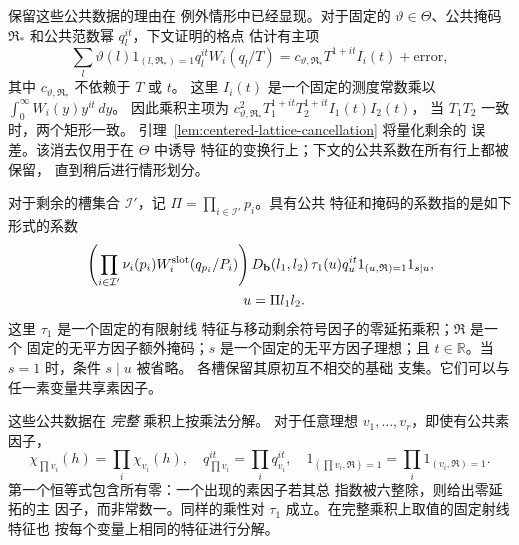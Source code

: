 \documentclass[11pt,a4paper]{article}
\numberwithin{equation}{section}
\numberwithin{figure}{section}
\theoremstyle{definition}
\theoremstyle{remark}
\begin{document}
保留这些公共数据的理由在
例外情形中已经显现。对于固定的 \(\vartheta\in\Theta\)、公共掩码
\(\mathfrak R_*\) 和公共范数幂 \(q_l^{it}\)，下文证明的格点
估计有主项
\[
 \sum_l\vartheta(l)1_{(l,\mathfrak R_*)=1}q_l^{it}W_i(q_l/T)
 =c_{\vartheta,\mathfrak R_*}T^{1+it}I_i(t)+\text{error},
\]
其中 \(c_{\vartheta,\mathfrak R_*}\) 不依赖于 \(T\) 或 \(t\)。
这里 \(I_i(t)\) 是一个固定的测度常数乘以
\(\int_0^\infty W_i(y)y^{it}\,dy\)。
因此乘积主项为
\(c_{\vartheta,\mathfrak R_*}^2T_1^{1+it}T_2^{1+it}I_1(t)I_2(t)\)，
当 \(T_1T_2\) 一致时，两个矩形一致。
引理~\ref{lem:centered-lattice-cancellation} 将量化剩余的
误差。该消去仅用于在 \(\Theta\) 中诱导
特征的变换行上；下文的公共系数在所有行上都被保留，
直到稍后进行情形划分。

对于剩余的槽集合 \(\mathcal I'\)，记
\(\Pi=\prod_{i\in\mathcal I'}p_i\)。具有公共
特征和掩码的系数指的是如下形式的系数
\begin{equation}
 \begin{split}
 &\left(\prod_{i\in\mathcal I'}
       \nu_i(p_i)W_i^{\rm slot}(q_{p_i}/P_i)\right)
 D_{\mathbf b}(l_1,l_2)\,
 \tau_1(u)q_u^{it}
 1_{(u,\mathfrak R)=1}1_{s\mid u},\\
 &\hspace{40mm}u=\Pi l_1l_2.
 \end{split}
 \label{eq:centered-coefficient-form}
\end{equation}
这里 \(\tau_1\) 是一个固定的有限射线
特征与移动剩余符号因子的零延拓乘积；\(\mathfrak R\) 是一个
固定的无平方因子额外掩码；\(s\) 是一个固定的无平方因子理想；且
\(t\in\mathbb R\)。当 \(s=1\) 时，条件 \(s\mid u\) 被省略。
各槽保留其原初互不相交的基础
支集。它们可以与任一素变量共享素因子。

这些公共数据在 \emph{完整} 乘积上按乘法分解。
对于任意理想 \(v_1,\ldots,v_r\)，即使有公共素因子，
\[
 \chi_{\prod v_i}(h)=\prod_i\chi_{v_i}(h),\quad
 q_{\prod v_i}^{it}=\prod_iq_{v_i}^{it},\quad
 1_{(\prod v_i,\mathfrak R)=1}
   =\prod_i1_{(v_i,\mathfrak R)=1}.
\]
第一个恒等式包含所有零：一个出现的素因子若其总
指数被六整除，则给出零延拓的主
因子，而非常数一。同样的乘性对
\(\tau_1\) 成立。在完整乘积上取值的固定射线特征也
按每个变量上相同的特征进行分解。
\end{document}
